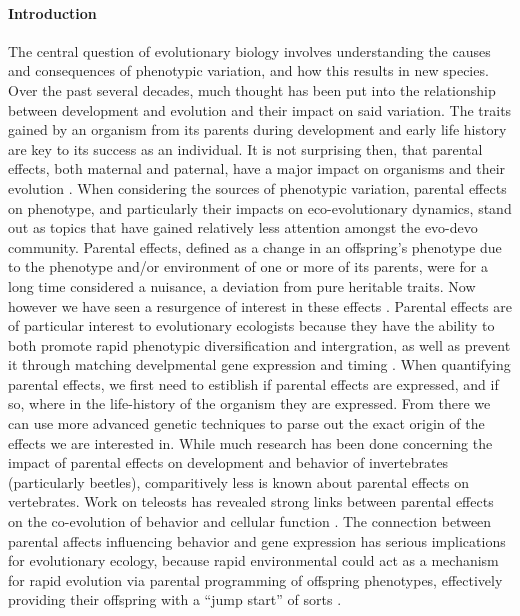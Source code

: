 \documentclass[12pt]{extarticle}
\begin{document}
\paragraph{Introduction}
The central question of evolutionary biology involves understanding the causes and consequences of phenotypic variation, and how this results in new species. Over the past several decades, much thought has been put into the relationship between development and evolution and their impact on said variation.
The traits gained by an organism from its parents during development and early life history are key to its success as an individual. It is not surprising then, that parental effects, both maternal and paternal, have a major impact on organisms and their evolution \citep{charmantier_garant_kruuk_2014, Danchin2011, Badyaev2009}. When considering the sources of phenotypic variation, parental effects on phenotype, and particularly their impacts on eco-evolutionary dynamics, stand out as topics that have gained relatively less attention amongst the evo-devo community. Parental effects, defined as a change in an offspring's phenotype due to the phenotype and/or environment of one or more of its parents, were for a long time considered a nuisance, a deviation from pure heritable traits. Now however we have seen a resurgence of interest in these effects \citep{charmantier_garant_kruuk_2014}.
Parental effects are of particular interest to evolutionary ecologists because they have the ability to both promote rapid phenotypic diversification and intergration, as well as prevent it through matching develpmental gene expression and timing \citep{Badyaev2009}. When quantifying parental effects, we first need to estiblish if parental effects are expressed, and if so, where in the life-history of the organism they are expressed. From there we can use more advanced genetic techniques to parse out the exact origin of the effects we are interested in. While much research has been done concerning the impact of parental effects on development \citep{Tigreros2021} and behavior of invertebrates (particularly beetles), comparitively less is known about parental effects on vertebrates. Work on teleosts has revealed strong links between parental effects on the co-evolution of behavior and cellular function \citep{Yoshizawa2012}. The connection between parental affects influencing behavior and gene expression has serious implications for evolutionary ecology, because rapid environmental could act as a mechanism for rapid evolution via parental programming of offspring phenotypes, effectively providing their offspring with a ``jump start'' of sorts \citep{Danchin2011, Donelson2018}. 
\end{document}
